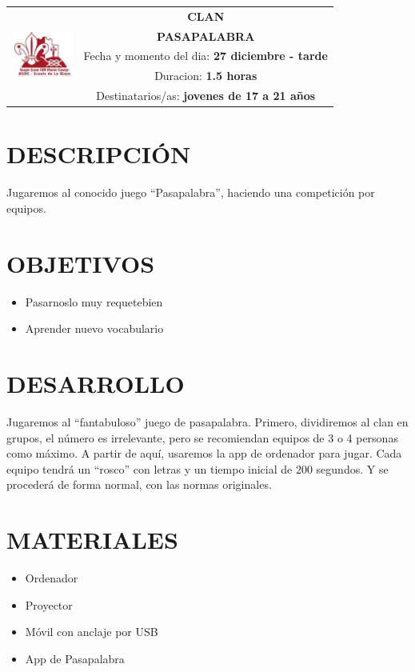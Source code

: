 \documentclass[72pt]{article}
\newlength{\w}
\begin{document}
\large
{}\selectfont
\begin{tabular}{|p{2cm}|c|}
\hline
\multirow{5}{*}{\includegraphics[width=2cm]{logo}} & \textbf{CLAN} \\ %
\cline{2-2}
& \textbf{PASAPALABRA} \\ %
\cline{2-2}
& \parbox{\textwidth-4cm}{Fecha y momento del dia: \textbf{27 diciembre - tarde}} \\ %
& \parbox{\textwidth-4cm}{Duracion: \textbf{1.5 horas}} \\ %
& \parbox{\textwidth-4cm}{Destinatarios/as: \textbf{jovenes de 17 a 21 años}} \\ %
\hline
\end{tabular}

\section*{DESCRIPCI\'ON}
    Jugaremos al conocido juego ``Pasapalabra'', haciendo una competición por equipos.
\section*{OBJETIVOS} 
\begin{itemize}
    \item Pasarnoslo muy requetebien
    \item Aprender nuevo vocabulario
\end{itemize}

\section*{DESARROLLO} 
    Jugaremos al ``fantabuloso'' juego de pasapalabra. Primero, dividiremos al clan en
    grupos, el número es irrelevante, pero se recomiendan equipos de 3 o 4 personas
    como máximo. A partir de aquí, usaremos la app de ordenador para jugar. Cada equipo
    tendrá un ``rosco'' con letras y un tiempo inicial de 200 segundos. Y se procederá
    de forma normal, con las normas originales.
\section*{MATERIALES}
\begin{itemize} 
    \item Ordenador
    \item Proyector
    \item Móvil con anclaje por USB
    \item App de Pasapalabra
\end{itemize}
\end{document}
